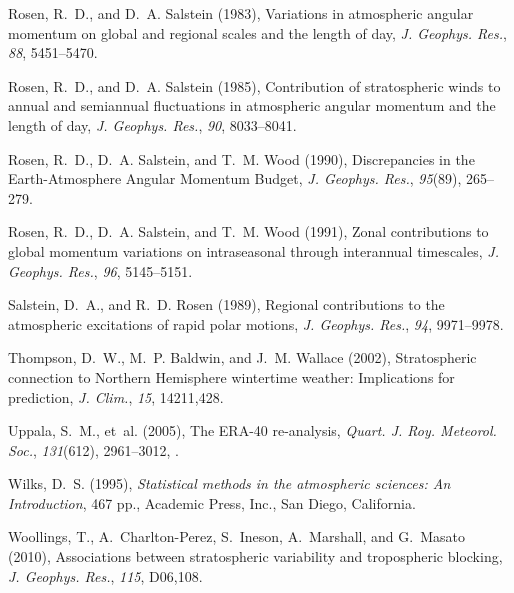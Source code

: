 \documentclass[draft,jgrga]{agutex}
\begin{document}
\begin{article}
\begin{thebibliography}{38}
Rosen, R.~D., and D.~A. Salstein (1983), Variations in atmospheric angular
  momentum on global and regional scales and the length of day, \textit{J.
  Geophys. Res.}, \textit{88}, 5451--5470.

Rosen, R.~D., and D.~A. Salstein (1985), Contribution of stratospheric winds to
  annual and semiannual fluctuations in atmospheric angular momentum and the
  length of day, \textit{J. Geophys. Res.}, \textit{90}, 8033--8041.

Rosen, R.~D., D.~A. Salstein, and T.~M. Wood (1990), {Discrepancies in the
  Earth-Atmosphere Angular Momentum Budget}, \textit{J. Geophys. Res.},
  \textit{95}(89), 265--279.

Rosen, R.~D., D.~A. Salstein, and T.~M. Wood (1991), Zonal contributions to
  global momentum variations on intraseasonal through interannual timescales,
  \textit{J. Geophys. Res.}, \textit{96}, 5145--5151.

Salstein, D.~A., and R.~D. Rosen (1989), Regional contributions to the
  atmospheric excitations of rapid polar motions, \textit{J. Geophys. Res.},
  \textit{94}, 9971--9978.

Thompson, D.~W., M.~P. Baldwin, and J.~M. Wallace (2002), Stratospheric
  connection to {Northern Hemisphere} wintertime weather: {Implications} for
  prediction, \textit{J. Clim.}, \textit{15}, 14211,428.

Uppala, S.~M., et~al. (2005), The {ERA}-40 re-analysis, \textit{Quart. J. Roy.
  Meteorol. Soc.}, \textit{131}(612), 2961--3012, .

Wilks, D.~S. (1995), \textit{Statistical methods in the atmospheric sciences:
  An Introduction}, 467 pp., Academic Press, Inc., San Diego, California.

Woollings, T., A.~Charlton-Perez, S.~Ineson, A.~Marshall, and G.~Masato (2010),
  Associations between stratospheric variability and tropospheric blocking,
  \textit{J. Geophys. Res.}, \textit{115}, D06,108.


\end{thebibliography}
\end{article}
\end{document}
